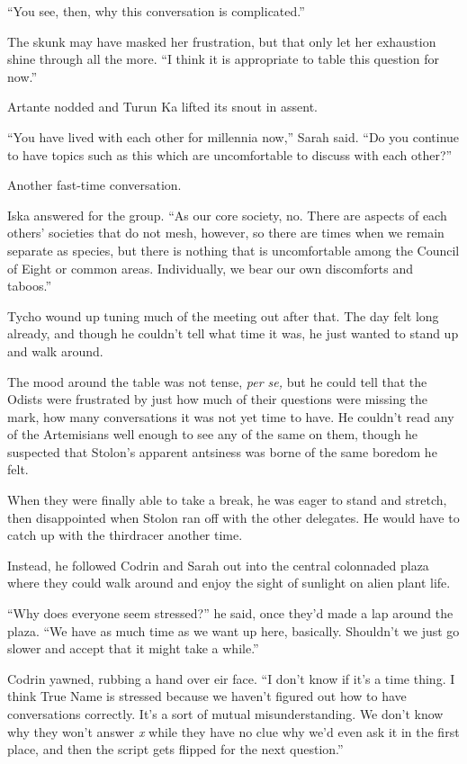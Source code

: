 ``You see, then, why this conversation is complicated.''

The skunk may have masked her frustration, but that only let her exhaustion shine through all the more. ``I think it is appropriate to table this question for now.''

Artante nodded and Turun Ka lifted its snout in assent.

``You have lived with each other for millennia now,'' Sarah said. ``Do you continue to have topics such as this which are uncomfortable to discuss with each other?''

Another fast-time conversation.

Iska answered for the group. ``As our core society, no. There are aspects of each others' societies that do not mesh, however, so there are times when we remain separate as species, but there is nothing that is uncomfortable among the Council of Eight or common areas. Individually, we bear our own discomforts and taboos.''

Tycho wound up tuning much of the meeting out after that. The day felt long already, and though he couldn't tell what time it was, he just wanted to stand up and walk around.

The mood around the table was not tense, \emph{per se,} but he could tell that the Odists were frustrated by just how much of their questions were missing the mark, how many conversations it was not yet time to have. He couldn't read any of the Artemisians well enough to see any of the same on them, though he suspected that Stolon's apparent antsiness was borne of the same boredom he felt.

When they were finally able to take a break, he was eager to stand and stretch, then disappointed when Stolon ran off with the other delegates. He would have to catch up with the thirdracer another time.

Instead, he followed Codrin and Sarah out into the central colonnaded plaza where they could walk around and enjoy the sight of sunlight on alien plant life.

``Why does everyone seem stressed?'' he said, once they'd made a lap around the plaza. ``We have as much time as we want up here, basically. Shouldn't we just go slower and accept that it might take a while.''

Codrin yawned, rubbing a hand over eir face. ``I don't know if it's a time thing. I think True Name is stressed because we haven't figured out how to have conversations correctly. It's a sort of mutual misunderstanding. We don't know why they won't answer \emph{x} while they have no clue why we'd even ask it in the first place, and then the script gets flipped for the next question.''

